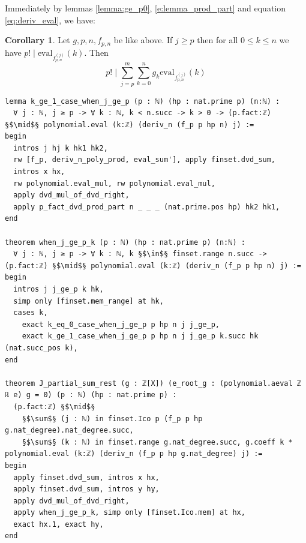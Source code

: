 \documentclass{report}
\theoremstyle{definition}
\newtheorem{corollary}{Corollary}[section]
\begin{document}
Immediately by lemmas \ref{lemma:ge_p0}, \ref{e:lemma_prod_part} and equation \ref{eq:deriv_eval}, we have:
\begin{corollary}
Let $g,p,n,f_{p,n}$ be like above. If $j\ge p$ then for all $0\le k\le n$ we have $p!\mid\mathrm{eval}_{f_{p,n}^{(j)}}(k)$. Then
$$
p!\mid\sum_{j=p}^m\sum_{k=0}^n g_k\mathrm{eval}_{f_{p,n}^{(j)}}(k)
$$

\begin{verbatim}
lemma k_ge_1_case_when_j_ge_p (p : ℕ) (hp : nat.prime p) (n:ℕ) :
  ∀ j : ℕ, j ≥ p -> ∀ k : ℕ, k < n.succ -> k > 0 -> (p.fact:ℤ) §$\mid$§ polynomial.eval (k:ℤ) (deriv_n (f_p p hp n) j) := 
begin
  intros j hj k hk1 hk2,
  rw [f_p, deriv_n_poly_prod, eval_sum'], apply finset.dvd_sum, 
  intros x hx,
  rw polynomial.eval_mul, rw polynomial.eval_mul,
  apply dvd_mul_of_dvd_right,
  apply p_fact_dvd_prod_part n _ _ _ (nat.prime.pos hp) hk2 hk1,
end

theorem when_j_ge_p_k (p : ℕ) (hp : nat.prime p) (n:ℕ) :
  ∀ j : ℕ, j ≥ p -> ∀ k : ℕ, k §$\in$§ finset.range n.succ -> (p.fact:ℤ) §$\mid$§ polynomial.eval (k:ℤ) (deriv_n (f_p p hp n) j) :=
begin
  intros j j_ge_p k hk,
  simp only [finset.mem_range] at hk,
  cases k,
    exact k_eq_0_case_when_j_ge_p p hp n j j_ge_p,
    exact k_ge_1_case_when_j_ge_p p hp n j j_ge_p k.succ hk (nat.succ_pos k),
end

theorem J_partial_sum_rest (g : ℤ[X]) (e_root_g : (polynomial.aeval ℤ ℝ e) g = 0) (p : ℕ) (hp : nat.prime p) :
  (p.fact:ℤ) §$\mid$§ 
    §$\sum$§ (j : ℕ) in finset.Ico p (f_p p hp g.nat_degree).nat_degree.succ,
    §$\sum$§ (k : ℕ) in finset.range g.nat_degree.succ, g.coeff k * polynomial.eval (k:ℤ) (deriv_n (f_p p hp g.nat_degree) j) :=
begin
  apply finset.dvd_sum, intros x hx, 
  apply finset.dvd_sum, intros y hy,
  apply dvd_mul_of_dvd_right,
  apply when_j_ge_p_k, simp only [finset.Ico.mem] at hx, 
  exact hx.1, exact hy,
end
\end{verbatim}
\end{corollary}
\end{document}
